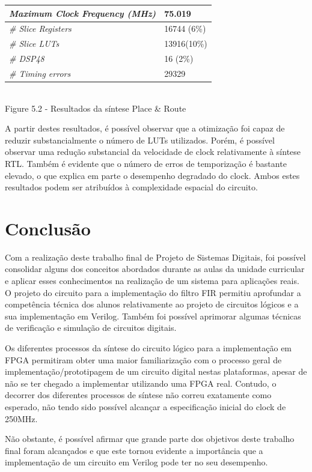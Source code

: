 \documentclass[10pt,twoside]{article}
\begin{document}
\begin{center}
	\begin{tabular}{|l|l|}
		\cline{1-2}
		\textit{Maximum Clock Frequency (MHz)} & 75.019\\
		\hline
		\textit{\# Slice Registers} & 16744 (6\%) \\
		\hline
		\textit{\# Slice LUTs} & 13916(10\%) \\
		\hline
		\textit{\# DSP48} & 16 (2\%) \\
		\hline
		\textit{\# Timing errors} & 29329\\
		\hline
	\end{tabular}\\
	\vspace{5pt}
	Figure 5.2 - Resultados da síntese Place \& Route
\end{center}

A partir destes resultados, é possível observar que a otimização foi capaz de reduzir substancialmente o número de LUTs utilizados. Porém, é possível observar uma redução substancial da velocidade de clock relativamente à síntese RTL. Também é evidente que o número de erros de temporização é bastante elevado, o que explica em parte o desempenho degradado do clock. Ambos estes resultados podem ser atribuídos à complexidade espacial do circuito. 

\section{Conclusão}

Com a realização deste trabalho final de Projeto de Sistemas Digitais, foi possível consolidar alguns dos conceitos abordados durante as aulas da unidade curricular e aplicar esses conhecimentos na realização de um sistema para aplicações reais. O projeto do circuito para a implementação do filtro FIR permitiu aprofundar a competência técnica dos alunos relativamente ao projeto de circuitos lógicos e a sua implementação em Verilog. Também foi possível aprimorar algumas técnicas de verificação e simulação de circuitos digitais.

Os diferentes processos da síntese do circuito lógico para a implementação em FPGA permitiram obter uma maior familiarização com o processo geral de implementação/prototipagem de um circuito digital nestas plataformas, apesar de não se ter chegado a implementar utilizando uma FPGA real. Contudo, o decorrer dos diferentes processos de síntese não correu exatamente como esperado, não tendo sido possível alcançar a especificação inicial do clock de 250MHz.

Não obstante, é possível afirmar que grande parte dos objetivos deste trabalho final foram alcançados e que este tornou evidente a importância que a implementação de um circuito em Verilog pode ter no seu desempenho.
\end{document}
